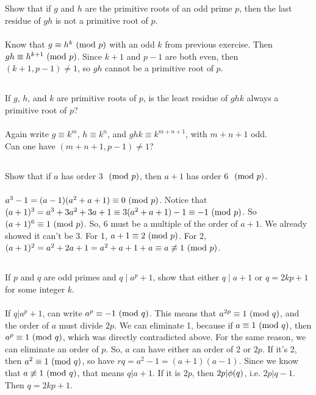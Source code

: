 \documentclass{article} \usepackage{amsmath}
\begin{document}
\subsection{}
Show that if $g$ and $h$ are the primitive roots of an odd prime $p$,
then the last residue of $gh$ is not a primitive root of $p$.\\~\\
Know that $g \equiv h^k \ (\mathrm{mod}\ p)$ with an odd $k$ from previous exercise.
Then $gh \equiv h^{k + 1} \ (\mathrm{mod}\ p)$.
Since $k + 1$ and $p - 1$ are both even, then $(k + 1, p - 1) \neq 1$,
so $gh$ cannot be a primitive root of $p$.

\subsection{}
If $g$, $h$, and $k$ are primitive roots of $p$, is the least residue of
$ghk$ always a primitive root of $p$?\\~\\
Again write $g \equiv k^m$, $h \equiv k^n$, and
$ghk \equiv k^{m + n + 1}$, with $m + n + 1$ odd.\\
Can one have $(m + n + 1, p - 1) \neq 1$?

\subsection{}
Show that if $a$ has order 3 $\ (\mathrm{mod}\ p)$, then $a + 1$ has order 6 $\ (\mathrm{mod}\ p)$.\\~\\
$a^3 - 1 = (a - 1)(a^2 + a + 1) \equiv 0 \ (\mathrm{mod}\ p)$.
Notice that $(a + 1)^3 = a^3 + 3a^2 + 3a + 1 \equiv 3(a^2 + a + 1) - 1 \equiv -1
\ (\mathrm{mod}\ p)$.
So $(a + 1)^6 \equiv 1 \ (\mathrm{mod}\ p)$.
So, 6 must be a multiple of the order of $a + 1$.
We already showed it can't be 3.
For 1, $a + 1 \equiv 2 \ (\mathrm{mod}\ p)$.
For 2, $(a + 1)^2 = a^2 + 2a + 1 = a^2 + a + 1 + a \equiv a \not\equiv 1 \ (\mathrm{mod}\ p)$.

\subsection{}
If $p$ and $q$ are odd primes and $q \mid a^p + 1$,
show that either $q \mid a + 1$ or $q = 2kp + 1$ for some integer $k$.\\~\\
If $q|a^p + 1$, can write $a^p \equiv -1 \ (\mathrm{mod}\ q)$.
This means that $a^{2p} \equiv 1 \ (\mathrm{mod}\ q)$, and the order of $a$
must divide $2p$.
We can eliminate 1, because if $a \equiv 1 \ (\mathrm{mod}\ q)$, then $a^p \equiv 1 \ (\mathrm{mod}\ q)$,
which was directly contradicted above.
For the same reason, we can eliminate an order of $p$.
So, $a$ can have either an order of 2 or $2p$.
If it's 2, then $a^2 \equiv 1 \ (\mathrm{mod}\ q)$, so have $rq = a^2 - 1 = (a + 1)(a - 1)$.
Since we know that $a \not\equiv 1 \ (\mathrm{mod}\ q)$, that means $q|a + 1$.
If it is $2p$, then $2p|\phi(q)$, i.e. $2p|q - 1$. Then $q = 2kp + 1$.
\end{document}
